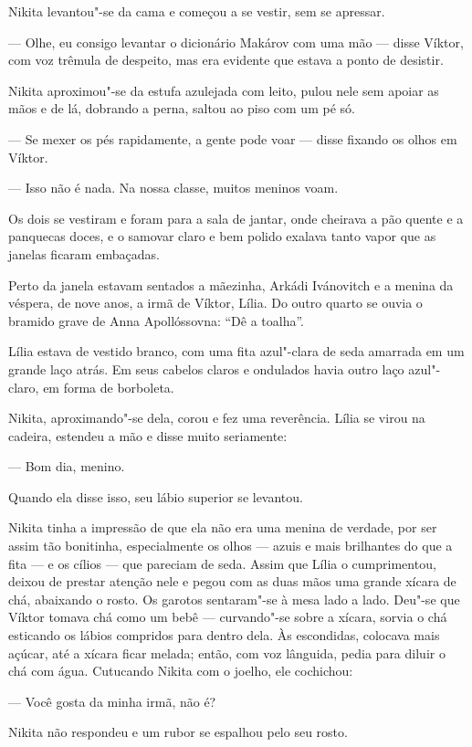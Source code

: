 Nikita levantou"-se da cama e começou a se vestir, sem se apressar.

--- Olhe, eu consigo levantar o dicionário Makárov com uma mão --- disse
Víktor, com voz trêmula de despeito, mas era evidente que estava a ponto
de desistir.

Nikita aproximou"-se da estufa azulejada com leito, pulou nele sem
apoiar as mãos e de lá, dobrando a perna, saltou ao piso com um pé só.

--- Se mexer os pés rapidamente, a gente pode voar --- disse fixando os
olhos em Víktor.

--- Isso não é nada. Na nossa classe, muitos meninos voam.

Os dois se vestiram e foram para a sala de jantar, onde cheirava a pão
quente e a panquecas doces, e o samovar claro e bem polido exalava tanto
vapor que as janelas ficaram embaçadas.

Perto da janela estavam sentados a mãezinha, Arkádi Ivánovitch e a
menina da véspera, de nove anos, a irmã de Víktor, Lília. Do outro
quarto se ouvia o bramido grave de Anna Apollóssovna: ``Dê a toalha''.

Lília estava de vestido branco, com uma fita azul"-clara de seda amarrada
em um grande laço atrás. Em seus cabelos claros e ondulados havia outro
laço azul"-claro, em forma de borboleta.

Nikita, aproximando"-se dela, corou e fez uma reverência. Lília se virou
na cadeira, estendeu a mão e disse muito seriamente:

--- Bom dia, menino.

Quando ela disse isso, seu lábio superior se levantou.

Nikita tinha a impressão de que ela não era uma menina de verdade, por
ser assim tão bonitinha, especialmente os olhos --- azuis e mais
brilhantes do que a fita --- e os cílios --- que pareciam de seda. Assim
que Lília o cumprimentou, deixou de prestar atenção nele e pegou com as
duas mãos uma grande xícara de chá, abaixando o rosto. Os garotos
sentaram"-se à mesa lado a lado. Deu"-se que Víktor tomava chá como um
bebê --- curvando"-se sobre a xícara, sorvia o chá esticando os lábios
compridos para dentro dela. Às escondidas, colocava mais açúcar, até a
xícara ficar melada; então, com voz lânguida, pedia para diluir o chá
com água. Cutucando Nikita com o joelho, ele cochichou:

--- Você gosta da minha irmã, não é?

Nikita não respondeu e um rubor se espalhou pelo seu rosto.

